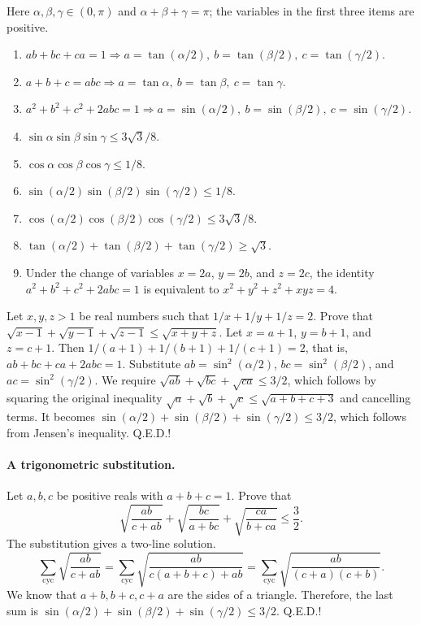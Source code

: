 \documentclass[11pt,a4paper]{article}
\begin{document}
\setcounter{theorem}{96}\begin{lemma}\label{lemma:lb1-99}
Here $\alpha,\beta,\gamma\in(0,\pi)$ and
$\alpha+\beta+\gamma=\pi$; the variables in the first three items are positive.
\begin{enumerate}
\setcounter{enumi}{0}\item $ab+bc+ca=1\Longrightarrow a=\tan(\alpha/2),\ b=\tan(\beta/2),\ c=\tan(\gamma/2)$.
\setcounter{enumi}{1}\item $a+b+c=abc\Longrightarrow a=\tan\alpha,\ b=\tan\beta,\ c=\tan\gamma$.
\setcounter{enumi}{2}\item $a^2+b^2+c^2+2abc=1\Longrightarrow a=\sin(\alpha/2),\ b=\sin(\beta/2),\ c=\sin(\gamma/2)$.
\setcounter{enumi}{3}\item $\sin\alpha\sin\beta\sin\gamma\leq3\sqrt3/8$.
\setcounter{enumi}{4}\item $\cos\alpha\cos\beta\cos\gamma\leq1/8$.
\setcounter{enumi}{5}\item $\sin(\alpha/2)\sin(\beta/2)\sin(\gamma/2)\leq1/8$.
\setcounter{enumi}{6}\item $\cos(\alpha/2)\cos(\beta/2)\cos(\gamma/2)\leq3\sqrt3/8$.
\setcounter{enumi}{7}\item $\tan(\alpha/2)+\tan(\beta/2)+\tan(\gamma/2)\geq\sqrt3$.
\setcounter{enumi}{8}\item Under the change of variables
$x=2a$, $y=2b$, and $z=2c$, the identity
$a^2+b^2+c^2+2abc=1$ is equivalent to $x^2+y^2+z^2+xyz=4$.
\end{enumerate}
\end{lemma}
Let $x,y,z>1$ be real numbers such that $1/x+1/y+1/z=2$.
Prove that $\sqrt{x-1}+\sqrt{y-1}+\sqrt{z-1}\leq\sqrt{x+y+z}$.
Let $x=a+1$, $y=b+1$, and $z=c+1$.
Then $1/(a+1)+1/(b+1)+1/(c+1)=2$, that is, $ab+bc+ca+2abc=1$.
Substitute $ab=\sin^2(\alpha/2)$, $bc=\sin^2(\beta/2)$, and $ac=\sin^2(\gamma/2)$.
We require $\sqrt{ab}+\sqrt{bc}+\sqrt{ca}\leq3/2$, which follows by squaring the original inequality
$\sqrt a+\sqrt b+\sqrt c\leq\sqrt{a+b+c+3}$ and cancelling terms.
It becomes $\sin(\alpha/2)+\sin(\beta/2)+\sin(\gamma/2)\leq3/2$, which follows from Jensen's inequality.
Q.E.D.!
\paragraph{A trigonometric substitution.}
Let $a,b,c$ be positive reals with $a+b+c=1$. Prove that
\[\sqrt{\frac{ab}{c+ab}}+\sqrt{\frac{bc}{a+bc}}+\sqrt{\frac{ca}{b+ca}}\leq\frac32.\]
The substitution gives a two-line solution.
\[\sum_{\mathrm{cyc}}\sqrt{\frac{ab}{c+ab}}
=\sum_{\mathrm{cyc}}\sqrt{\frac{ab}{c(a+b+c)+ab}}
=\sum_{\mathrm{cyc}}\sqrt{\frac{ab}{(c+a)(c+b)}}.\]
We know that $a+b,b+c,c+a$ are the sides of a triangle.
Therefore, the last sum is $\sin(\alpha/2)+\sin(\beta/2)+\sin(\gamma/2)\leq3/2$.
Q.E.D.!
\end{document}
